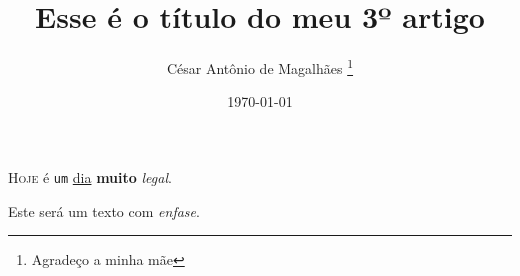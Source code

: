 \documentclass[12pt, a4paper]{article}
\title{Esse é o título do meu 3º artigo}
\author{César Antônio de Magalhães \thanks{Agradeço a minha mãe}}
\date{\today}
\begin{document}
\textsc{Hoje} é \texttt{um} \underline{dia} \textbf{muito} \textit{legal}.

Este será um texto com \emph{enfase}.
\end{document}
